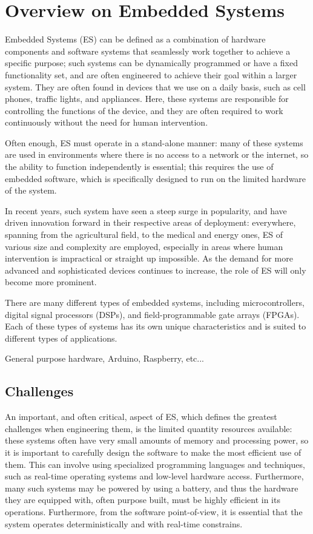 \section{Overview on Embedded Systems}
Embedded Systems (ES) can be defined as a combination of hardware components and software systems that seamlessly work together to achieve a specific purpose; such systems can be dynamically programmed or have a fixed functionality set, and are often engineered to achieve their goal within a larger system. They are often found in devices that we use on a daily basis, such as cell phones, traffic lights, and appliances. Here, these systems are responsible for controlling the functions of the device, and they are often required to work continuously without the need for human intervention.

Often enough, ES must operate in a stand-alone manner: many of these systems are used in environments where there is no access to a network or the internet, so the ability to function independently is essential; this requires the use of embedded software, which is specifically designed to run on the limited hardware of the system.

In recent years, such system have seen a steep surge in popularity, and have driven innovation forward in their respective areas of deployment: everywhere, spanning from the agricultural field, to the medical and energy ones, ES of various size and complexity are employed, especially in areas where human intervention is impractical or straight up impossible.
As the demand for more advanced and sophisticated devices continues to increase, the role of ES will only become more prominent.

There are many different types of embedded systems, including microcontrollers, digital signal processors (DSPs), and field-programmable gate arrays (FPGAs). Each of these types of systems has its own unique characteristics and is suited to different types of applications.

General purpose hardware, Arduino, Raspberry, etc...


\subsection {Challenges}
An important, and often critical, aspect of ES, which defines the greatest challenges when engineering them, is the limited quantity resources available: these systems often have very small amounts of memory and processing power, so it is important to carefully design the software to make the most efficient use of them. This can involve using specialized programming languages and techniques, such as real-time operating systems and low-level hardware access. Furthermore, many such systems may be powered by using a battery, and thus the hardware they are equipped with, often purpose built, must be highly efficient in its operations. Furthermore, from the software point-of-view, it is essential that the system operates deterministically and with real-time constrains.

